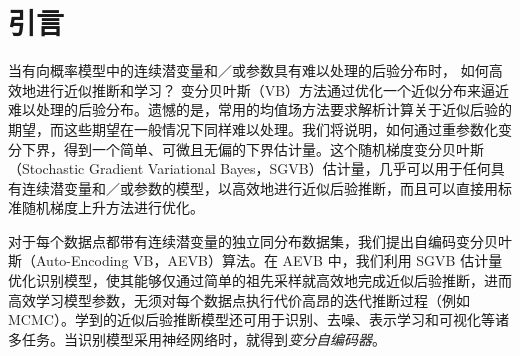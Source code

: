 \section{引言}


当有向概率模型中的连续潜变量和／或参数具有难以处理的后验分布时，
如何高效地进行近似推断和学习？
变分贝叶斯（VB）方法通过优化一个近似分布来逼近难以处理的后验分布。遗憾的是，常用的均值场方法要求解析计算关于近似后验的期望，而这些期望在一般情况下同样难以处理。我们将说明，如何通过重参数化变分下界，得到一个简单、可微且无偏的下界估计量。这个随机梯度变分贝叶斯（Stochastic Gradient Variational Bayes，SGVB）估计量，几乎可以用于任何具有连续潜变量和／或参数的模型，以高效地进行近似后验推断，而且可以直接用标准随机梯度上升方法进行优化。

对于每个数据点都带有连续潜变量的独立同分布数据集，我们提出自编码变分贝叶斯（Auto-Encoding VB，AEVB）算法。在 AEVB 中，我们利用 SGVB 估计量优化识别模型，使其能够仅通过简单的祖先采样就高效地完成近似后验推断，进而高效学习模型参数，无须对每个数据点执行代价高昂的迭代推断过程（例如 MCMC）。学到的近似后验推断模型还可用于识别、去噪、表示学习和可视化等诸多任务。当识别模型采用神经网络时，就得到\emph{变分自编码器}。
